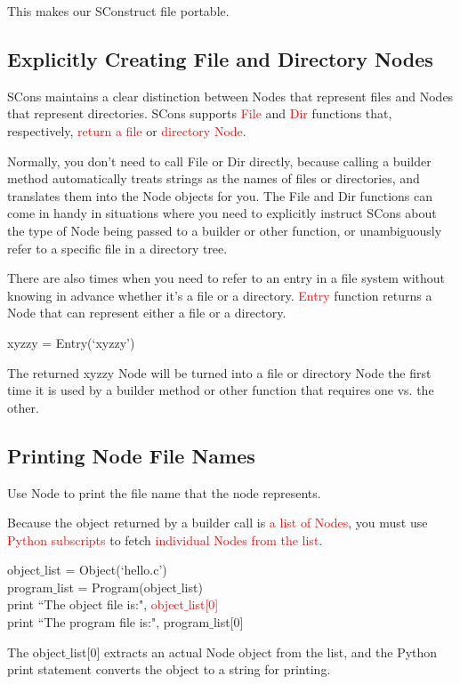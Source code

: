 \documentclass[12pt,a4paper]{article}
\begin{document}
This makes our SConstruct file portable.

\subsection{Explicitly Creating File and Directory Nodes}
SCons maintains a clear distinction between Nodes that represent files and Nodes that represent directories. SCons supports \textcolor{red}{File} and \textcolor{red}{Dir} functions that, respectively, \textcolor{red}{return a file} or  \textcolor{red}{directory Node}.

Normally, you don't need to call File or Dir directly, because calling a builder method automatically treats strings as the names of files or directories, and translates them into the Node objects for you. The File and Dir functions can come in handy in situations where you need to explicitly instruct SCons about the type of Node being passed to a builder or other function, or unambiguously refer to a specific file in a directory tree.


There are also times when you need to refer to an entry in a file system without knowing in advance whether it's a file or a directory. \textcolor{red}{Entry} function returns a Node that can represent either a file or a directory.

xyzzy = Entry(`xyzzy')

The returned xyzzy Node will be turned into a file or directory Node the first time it is used by a builder method or other function that requires one vs. the other.

\subsection{Printing Node File Names}
Use Node to print the file name that the node represents.

Because the object returned by a builder call is \textcolor{red}{a list of Nodes}, you must use \textcolor{red}{Python subscripts} to fetch \textcolor{red}{individual Nodes from the list}.

object$\_$list = Object(`hello.c') \\
program$\_$list = Program(object$\_$list) \\
print ``The object file is:", \textcolor{red}{object$\_$list[0]} \\
print ``The program file is:", program$\_$list[0]

The object$\_$list[0] extracts an actual Node object from the list, and the Python print statement converts the object to a string for printing.
\end{document}
